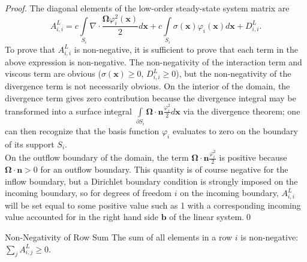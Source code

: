 \begin{proof}
The diagonal elements  of the low-order steady-state system matrix are
\[
	A^L_{i,i} = c\int\limits_{S_{i}}\nabla\cdot
   \frac{\mathbf{\Omega}\varphi_i^2(\mathbf{x})}{2} d\mathbf{x} 
      + c\int\limits_{S_{i}}\sigma(\mathbf{x})\varphi_i(\mathbf{x})d\mathbf{x}
      + D_{i,i}^L.
\]
To prove that $A^L_{i,i}$ is non-negative, it is sufficient to prove that
each term in the above expression is non-negative. The non-negativity of
the interaction term and viscous term are obvious ($\sigma(\mathbf{x}) \ge 0$,
$D_{i,i}^L\geq 0$), but
the non-negativity of the divergence term is not necessarily obvious. On the interior of
the domain, the divergence term gives zero contribution because the divergence integral may
be transformed into a surface integral $\int\limits_{\partial S_{i}}
\mathbf{\Omega}\cdot\mathbf{n}\frac{\varphi_i^2}{2} d\mathbf{x}$
via the divergence theorem; one can then recognize that
the basis function $\varphi_i$ evaluates to zero on the boundary of its support $S_{i}$.\\
On the outflow boundary of the domain, the term $\mathbf{\Omega}\cdot\mathbf{n}
\frac{\varphi_i^2}{2}$ is positive because $\mathbf{\Omega}\cdot\mathbf{n} >0$
for an outflow boundary. This quantity is of course negative for the inflow boundary,
but a Dirichlet boundary condition is strongly imposed on the incoming boundary, so
for degrees of freedom $i$ on the incoming boundary, $A^L_{i,i}$ will be set equal
to some positive value such as 1 with a corresponding incoming value
accounted for in the right hand side $\mathbf{b}$ of the linear system.\qed
\end{proof}
\begin{lemma}{Non-Negativity of Row Sum}
   The sum of all elements in a row $i$ is non-negative: $\sum\limits_j A^L_{i,j} \ge 0$.
\end{lemma}

